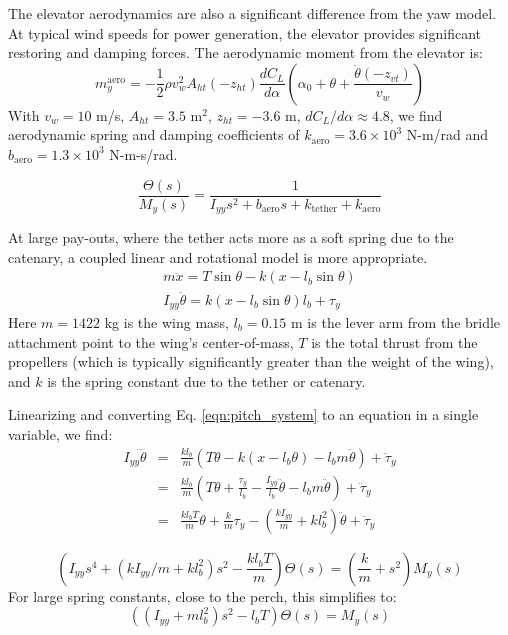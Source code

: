 \documentclass[11pt]{amsart}
\begin{document}
The elevator aerodynamics are also a significant difference from the
yaw model.  At typical wind speeds for power generation, the elevator
provides significant restoring and damping forces.  The aerodynamic
moment from the elevator is:
\begin{equation}
m^{\mathrm{aero}}_y =
-\frac{1}{2} \rho v_w^2 A_{ht} (-z_{ht}) \frac{dC_L}{d\alpha}
\left(\alpha_0 + \theta + \frac{\dot \theta (-z_{vt})}{v_w}\right)
\end{equation}
With $v_w = 10$ m/s, $A_{ht} = 3.5$ m$^2$, $z_{ht}=-3.6$ m,
$dC_L/d\alpha \approx 4.8$, we find aerodynamic spring and damping
coefficients of $k_{\mathrm{aero}} = 3.6 \times 10^3$ N-m/rad and
$b_{\mathrm{aero}} = 1.3 \times 10^3$ N-m-s/rad.

\begin{equation}
\frac{\Theta(s)}{M_y(s)} =
\frac{1}{I_{yy} s^2 + b_{\mathrm{aero}} s + k_{\mathrm{tether}} + k_{\mathrm{aero}}}
\end{equation}

At large pay-outs, where the tether acts more as a soft spring due to
the catenary, a coupled linear and rotational model is more
appropriate.
\begin{eqnarray}
m \ddot{x} = T \sin \theta - k (x - l_b \sin \theta) \\
I_{yy} \ddot{\theta} = k (x - l_b \sin \theta) l_b + \tau_y
\label{eqn:pitch_system}
\end{eqnarray}
Here $m = 1422$ kg is the wing mass, $l_b = 0.15$ m is the lever arm
from the bridle attachment point to the wing's center-of-mass, $T$ is
the total thrust from the propellers (which is typically significantly
greater than the weight of the wing), and $k$ is the spring constant
due to the tether or catenary.

Linearizing and converting Eq. \ref{eqn:pitch_system} to an equation
in a single variable, we find:
\begin{eqnarray}
I_{yy} \ddddot{\theta} &=&
\frac{k l_b}{m} \left( T \theta - k(x - l_b \theta) - l_b m \ddot{\theta} \right)
+ \ddot{\tau}_y \\
&=&
\frac{k l_b}{m} \left( T \theta + \frac{\tau_y}{l_b}
- \frac{I_{yy}}{l_b} \ddot{\theta}  - l_b m \ddot{\theta} \right) + \ddot{\tau}_y \\
&=&
\frac{k l_b T}{m} \theta + \frac{k}{m} \tau_y
- \left(\frac{k I_{yy}}{m} + k l_b^2 \right) \ddot{\theta} + \ddot{\tau}_y
\end{eqnarray}

\begin{equation}
\left(I_{yy} s^4 + \left(k I_{yy}/m + k l_b^2 \right) s^2
- \frac{k l_b T}{m} \right) \Theta(s) = \left(\frac{k}{m} + s^2\right) M_y(s)
\end{equation}
For large spring constants, close to the perch, this simplifies to:
\begin{equation}
\left((I_{yy} + m l_b^2) s^2 - l_b T \right)  \Theta(s) = M_y(s)
\end{equation}
\end{document}
